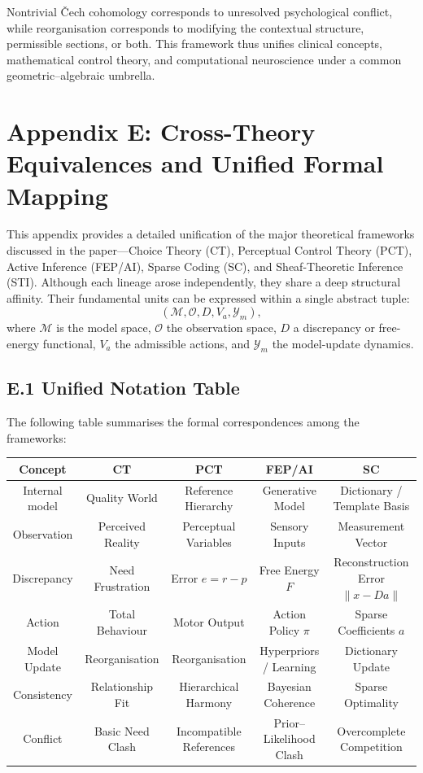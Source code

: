 \documentclass[11pt,a4paper,twoside]{article}
\begin{document}
Nontrivial Čech cohomology corresponds to unresolved psychological conflict, while reorganisation corresponds to modifying the contextual structure, permissible sections, or both. This framework thus unifies clinical concepts, mathematical control theory, and computational neuroscience under a common geometric–algebraic umbrella.

\section*{Appendix E: Cross-Theory Equivalences and Unified Formal Mapping}

This appendix provides a detailed unification of the major theoretical frameworks discussed in the paper—Choice Theory (CT), Perceptual Control Theory (PCT), Active Inference (FEP/AI), Sparse Coding (SC), and Sheaf-Theoretic Inference (STI). Although each lineage arose independently, they share a deep structural affinity. Their fundamental units can be expressed within a single abstract tuple:
\[
(\mathcal{M}, \mathcal{O}, D, V_{\!a}, \mathcal{Y}_m),
\]
where $\mathcal{M}$ is the model space, $\mathcal{O}$ the observation space, $D$ a discrepancy or free-energy functional, $V_{\!a}$ the admissible actions, and $\mathcal{Y}_m$ the model-update dynamics.

\subsection*{E.1 Unified Notation Table}

The following table summarises the formal correspondences among the frameworks:

\begin{center}
\begin{tabular}{|c|c|c|c|c|}
\hline
\textbf{Concept} & \textbf{CT} & \textbf{PCT} & \textbf{FEP/AI} & \textbf{SC} \\
\hline
Internal model & Quality World & Reference Hierarchy & Generative Model & Dictionary / Template Basis \\
\hline
Observation & Perceived Reality & Perceptual Variables & Sensory Inputs & Measurement Vector \\
\hline
Discrepancy & Need Frustration & Error $e = r-p$ & Free Energy $F$ & Reconstruction Error $\|x - Da\|$ \\
\hline
Action & Total Behaviour & Motor Output & Action Policy $\pi$ & Sparse Coefficients $a$ \\
\hline
Model Update & Reorganisation & Reorganisation & Hyperpriors / Learning & Dictionary Update \\
\hline
Consistency & Relationship Fit & Hierarchical Harmony & Bayesian Coherence & Sparse Optimality \\
\hline
Conflict & Basic Need Clash & Incompatible References & Prior–Likelihood Clash & Overcomplete Competition \\
\hline
\end{tabular}
\end{center}
\end{document}
